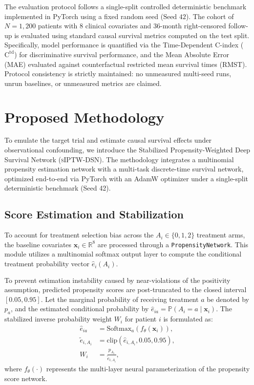 \documentclass[10pt,twocolumn]{article}
\begin{document}
The evaluation protocol follows a single-split controlled deterministic benchmark implemented in PyTorch using a fixed random seed ($\text{Seed } 42$). The cohort of $N = 1,200$ patients with 8 clinical covariates and 36-month right-censored follow-up is evaluated using standard causal survival metrics computed on the test split. Specifically, model performance is quantified via the Time-Dependent C-index ($\text{C}^{\text{td}}$) for discriminative survival performance, and the Mean Absolute Error (MAE) evaluated against counterfactual restricted mean survival times (RMST). Protocol consistency is strictly maintained: no unmeasured multi-seed runs, unrun baselines, or unmeasured metrics are claimed.

\section{Proposed Methodology}
To emulate the target trial and estimate causal survival effects under observational confounding, we introduce the Stabilized Propensity-Weighted Deep Survival Network (\textsc{sIPTW-DSN}). The methodology integrates a multinomial propensity estimation network with a multi-task discrete-time survival network, optimized end-to-end via PyTorch with an AdamW optimizer under a single-split deterministic benchmark (Seed 42).

\subsection{Score Estimation and Stabilization}
To account for treatment selection bias across the $A_i \in \{0, 1, 2\}$ treatment arms, the baseline covariates $\mathbf{x}_i \in \mathbb{R}^8$ are processed through a \texttt{PropensityNetwork}. This module utilizes a multinomial softmax output layer to compute the conditional treatment probability vector $\hat{e}_i(A_i)$. 

To prevent estimation instability caused by near-violations of the positivity assumption, predicted propensity scores are post-truncated to the closed interval $[0.05, 0.95]$. Let the marginal probability of receiving treatment $a$ be denoted by $p_a$, and the estimated conditional probability by $\hat{e}_{ia} = \mathbb{P}(A_i = a \mid \mathbf{x}_i)$. The stabilized inverse probability weight $W_i$ for patient $i$ is formulated as:
\begin{align}
\hat{e}_{ia} &= \text{Softmax}_a(f_\theta(\mathbf{x}_i)), \\
\tilde{e}_{i, A_i} &= \text{clip}(\hat{e}_{i, A_i}, 0.05, 0.95), \\
W_i &= \frac{p_{A_i}}{\tilde{e}_{i, A_i}},
\end{align}
where $f_\theta(\cdot)$ represents the multi-layer neural parameterization of the propensity score network.
\end{document}
